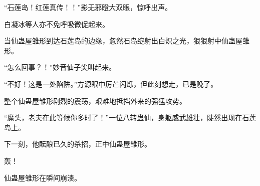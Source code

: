 \begin{this_body}
“石莲岛！红莲真传！！”影无邪瞪大双眼，惊呼出声。

白凝冰等人亦不免呼吸微促起来。

当仙蛊屋雏形到达石莲岛的边缘，忽然石岛绽射出白炽之光，狠狠射中仙蛊屋雏形。

“怎么回事？！”妙音仙子尖叫起来。

“不好！这是一处陷阱。”方源眼中厉芒闪烁，但此刻想走，已是晚了。

整个仙蛊屋雏形剧烈的震荡，艰难地抵挡外来的强猛攻势。

“魔头，老夫在此等候你多时了！”一位八转蛊仙，身躯威武雄壮，陡然出现在石莲岛上。

下一刻，他酝酿已久的杀招，正中仙蛊屋雏形。

轰！

仙蛊屋雏形在瞬间崩溃。

\end{this_body}

